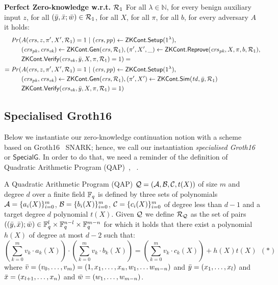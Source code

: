 \begin{definition}[ZK Continuations]
\noindent \textbf{Perfect Zero-knowledge w.r.t. $\mathcal{R}_1$} For all $\lambda \in \mathbb{N}$, for every benign auxiliary input $z$, 
for all  $(\bar{y}, \bar{x}; \bar{w}) \in \mathcal{R}_1$, for all $X$, for all $\pi$, for all $b$, for every adversary $A$ it holds:
\begin{align*}
\mathit{Pr}(& A(\mathit{crs}, z, \pi', X', \mathcal{R}_1) = 1 \ | \ (\mathit{crs}, \mathit{pp}) \leftarrow {\ensuremath{\mathsf{ZKCont}}}.{\mathsf{Setup}} (1^{\lambda}), \\
                  & (\mathit{crs}_{\mathit{pk}}, \mathit{crs}_{\mathit{vk}}) \leftarrow {\ensuremath{\mathsf{ZKCont}}}.\mathsf{Gen}(\mathit{crs}, \mathcal{R}_1), (\pi', X', \_) \leftarrow {\ensuremath{\mathsf{ZKCont}}}.{\mathsf{Reprove}} (\mathit{crs}_{\mathit{pk}}, X, \pi, b, \mathcal{R}_1), \\
                  &  {\mathsf{ZKCont}}.{\mathsf{Verify}}(\mathit{crs}_{\mathit{vk}}, \bar{y}, X, \pi, \mathcal{R}_1) = 1) =  \\
= \mathit{Pr}(& A(\mathit{crs}, z, \pi', X', \mathcal{R}_1) = 1 \ | \ (\mathit{crs}, \mathit{pp}) \leftarrow {\ensuremath{\mathsf{ZKCont}}}.{\mathsf{Setup}} (1^{\lambda}), \\ 
                     & (\mathit{crs}_{\mathit{pk}}, \mathit{crs}_{\mathit{vk}}) \leftarrow {\ensuremath{\mathsf{ZKCont}}}.\mathsf{Gen}(\mathit{crs}, \mathcal{R}_1), (\pi', X') \leftarrow {\ensuremath{\mathsf{ZKCont}}}.{\mathsf{Sim}}(\mathit{td}, \bar{y}, \mathcal{R}_1) \\ 
                     &  {\mathsf{ZKCont}}.{\mathsf{Verify}}(\mathit{crs}_{\mathit{vk}}, \bar{y}, X, \pi, \mathcal{R}_1) = 1)
\end{align*}
 
\end{definition} 


\subsection{Specialised Groth16}
\label{sec:rvrf_groth16}

Below we instantiate our zero-knowledge continuation notion with a scheme based on Groth16~\cite{Groth16} SNARK;
hence, we call our instantiation \emph{specialised Groth16} or \emph{$\mathsf{SpecialG}$}. In order to do that, we need a 
reminder of the definition of Quadratic Arithmetic Program (QAP)~\cite{LegoSNARK}, ~\cite{GGPR13}.

\begin{definition}[QAP] 
\label{def:QAP}
A Quadratic Arithmetic Program (QAP) $\mathcal{Q} = (\mathcal{A}, \mathcal{B}, \mathcal{C}, t(X))$ of size $m$ 
and degree $d$ over a finite field $\mathbb{F}_q$ is defined by three sets of polynomials $\mathcal{A} = \{a_i(X)\}_{i=0}^m$, 
$\mathcal{B} = \{b_i(X)\}_{i=0}^m$, $\mathcal{C} = \{c_i(X)\}_{i=0}^m$ of degree less than $d-1$ and a target degree $d$ polynomial $t(X)$. Given 
$\mathcal{Q}$ we define $\mathcal{R}_{\mathcal{Q}}$ as the set of pairs $((\bar{y}, \bar{x}); \bar{w}) \in \mathbb{F}_q^{l} \times \mathbb{F}_q^{n-l} \times \mathbb{F}_q^{m-n}$ for which it 
holds that there exist a polynomial $h(X)$ of degree at most $d-2$ such that:
$$(\sum_{k=0}^m v_k \cdot a_k(X)) \cdot (\sum_{k=0}^m v_k \cdot b_k(X)) = (\sum_{k=0}^m v_k \cdot c_k(X)) + h(X)t(X) \ \ (\ast)$$ 
where $\bar{v} = (v_0, \ldots, v_m) = (1, x_1, \ldots, x_n, w_1, \ldots w_{m-n})$ and $\bar{y} = (x_1, \ldots, x_l)$ and 
$\bar{x} = (x_{l+1}, \ldots, x_n)$ and $\bar{w} = (w_1, \ldots, w_{m-n})$. 
\end{definition}


